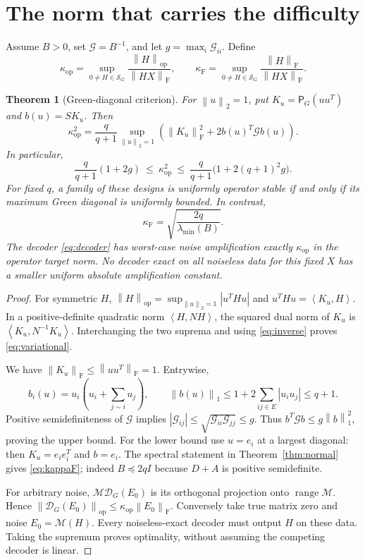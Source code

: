 \documentclass[11pt]{article}
\newtheorem{theorem}{Theorem}[section]
\theoremstyle{remark}\newtheorem{remark}[theorem]{Remark}
\newcommand{\op}{\mathrm{op}}
\newcommand{\F}{\mathrm F}
\newcommand{\SG}{\mathcal S_G}
\newcommand{\M}{\mathcal M}
\newcommand{\Pp}{\mathsf P}
\newcommand{\range}{\operatorname{range}}
\newcommand{\norm}[1]{\left\lVert #1\right\rVert}
\newcommand{\ip}[2]{\left\langle #1,#2\right\rangle}
\begin{document}
\section{The norm that carries the difficulty}

Assume $B>0$, set $\mathcal G=B^{-1}$, and let $g=\max_i\mathcal G_{ii}$. Define
\[
\kappa_{\op}=\sup_{0\ne H\in\SG}\frac{\norm H_{\op}}{\norm{HX}_{\F}},\qquad
\kappa_{\F}=\sup_{0\ne H\in\SG}\frac{\norm H_{\F}}{\norm{HX}_{\F}}.
\]

\begin{theorem}[Green-diagonal criterion]\label{thm:green}
For $\norm u_2=1$, put $K_u=\Pp_G(uu^T)$ and $b(u)=S K_u$. Then
\begin{equation}\label{eq:variational}
\kappa_{\op}^2=\frac q{q+1}\sup_{\norm u_2=1}
\left(\norm{K_u}_{\F}^2+2b(u)^T\mathcal G b(u)\right).
\end{equation}
In particular,
\begin{equation}\label{eq:kappa-bounds}
\frac q{q+1}(1+2g)\ \leq\ \kappa_{\op}^2\ \leq\
\frac q{q+1}\bigl(1+2(q+1)^2g\bigr).
\end{equation}
For fixed $q$, a family of these designs is uniformly operator stable if and only if its maximum Green diagonal is uniformly bounded. In contrast,
\begin{equation}\label{eq:kappaF}
\kappa_{\F}=\sqrt{\frac{2q}{\lambda_{\min}(B)}}.
\end{equation}
The decoder \eqref{eq:decoder} has worst-case noise amplification exactly $\kappa_{\op}$ in the operator target norm. No decoder exact on all noiseless data for this fixed $X$ has a smaller uniform absolute amplification constant.
\end{theorem}

\begin{proof}
For symmetric $H$, $\norm H_{\op}=\sup_{\norm u_2=1}|u^THu|$ and
$u^THu=\ip{K_u}{H}$. In a positive-definite quadratic norm $\ip H{NH}$, the squared dual norm of $K_u$ is $\ip{K_u}{N^{-1}K_u}$. Interchanging the two suprema and using \eqref{eq:inverse} proves \eqref{eq:variational}.

We have $\norm{K_u}_{\F}\leq\norm{uu^T}_{\F}=1$. Entrywise,
\[
b_i(u)=u_i\left(u_i+\sum_{j\sim i}u_j\right),\qquad
\norm{b(u)}_1\leq1+2\sum_{ij\in E}|u_iu_j|\leq q+1.
\]
Positive semidefiniteness of $\mathcal G$ implies
$|\mathcal G_{ij}|\leq\sqrt{\mathcal G_{ii}\mathcal G_{jj}}\leq g$. Thus
$b^T\mathcal G b\leq g\norm b_1^2$, proving the upper bound. For the lower bound use $u=e_i$ at a largest diagonal: then $K_u=e_ie_i^T$ and $b=e_i$. The spectral statement in Theorem~\ref{thm:normal} gives \eqref{eq:kappaF}; indeed $B\preceq2qI$ because $D+A$ is positive semidefinite.

For arbitrary noise, $\M\mathcal D_G(E_0)$ is its orthogonal projection onto $\range\M$. Hence
$\norm{\mathcal D_G(E_0)}_{\op}\leq\kappa_{\op}\norm{E_0}_{\F}$.
Conversely take true matrix zero and noise $E_0=\M(H)$. Every noiseless-exact decoder must output $H$ on these data. Taking the supremum proves optimality, without assuming the competing decoder is linear.
\end{proof}
\end{document}
